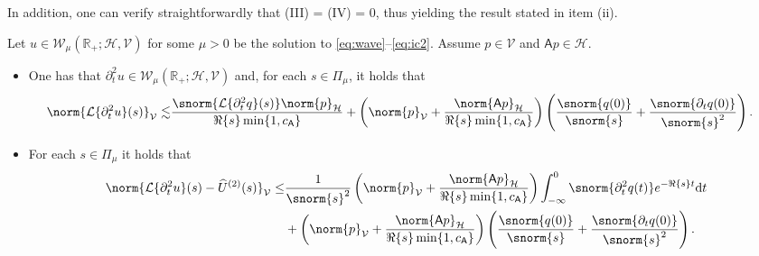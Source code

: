 In addition, one can verify straightforwardly that (III) = (IV) = 0,
thus yielding the result stated in item (ii).


\begin{lemma}\label{lmm:error_U}
Let $u \in \mathcal{W}_\mu(\mathbb{R}_+;\mathcal{H},\mathcal{V})$
for some $\mu>0$ be the solution to \eqref{eq:wave}--\eqref{eq:ic2}.
Assume $p \in \mathcal{V}$ and $\mathsf{A}p \in \mathcal{H}$.
\begin{itemize}
	\item[(i)]
	One has that $\partial^2_t u \in \mathcal{W}_{\mu}(\mathbb{R}_+;\mathcal{H},\mathcal{V})$
	and, for each $s \in \Pi_\mu$, it holds that
\begin{equation}\label{eq:bound_L_dt2_u}
\begin{aligned}
	\norm{
		\mathcal{L}\{\partial^2_t u\}(s)
	}_{\mathcal{V}}
	\lesssim
	&
	\frac{
		\snorm{\mathcal{L}\{\partial^2_t q\}(s)}
		\norm{p}_{\mathcal{H}}
	}{
		\Re\{s\} \min\{1, c_{\mathsf{A}}\}
	}
	+
	\left(
      	\norm{p}_{\mathcal{V}}
      	+
      	\frac{
			\norm{\mathsf{A}p}_{\mathcal{H}}
		}{
			\Re\{s\}  \min\{1, c_{\mathsf{A}}\}
		}
	\right)
	\left(
		\frac{\snorm{q(0)}}{\snorm{s}}
		+
		\frac{\snorm{\partial_t q(0)}}{\snorm{s}^2}
	\right).
\end{aligned}
\end{equation}
\item[(ii)] For each $s \in \Pi_\mu$ it holds that
\begin{equation}
\begin{aligned}
	\norm{
		\mathcal{L}\{\partial^2_t u\}(s)
		-
		\widehat{U}^{(2)}(s)
	}_{\mathcal{V}}
	\leq
	&
    \frac{1}{\snorm{s}^2}
    \left(
            \norm{p}_\mathcal{V}
            +
    		\frac{
        \norm{\mathsf{A}p}_{\mathcal{H}}
        }{
        \Re\{s\}  \min\{1, c_{\mathsf{A}}\}
        }
    \right)
	\int_{-\infty}^{0}
	\snorm{\partial^2_t  q (t)}
	e^{-\Re\{s\} t}
	\normalfont\text{d} t
	\\
	&
	+
	\left(
      	\norm{p}_{\mathcal{V}}
      	+
      	\frac{
			\norm{\mathsf{A}p}_{\mathcal{H}}
		}{
			\Re\{s\}  \min\{1, c_{\mathsf{A}}\}
		}
	\right)
	\left(
		\frac{\snorm{q(0)}}{\snorm{s}}
		+
		\frac{\snorm{\partial_t q(0)}}{\snorm{s}^2}
	\right).
\end{aligned}
\end{equation}
\end{itemize}
\end{lemma}

